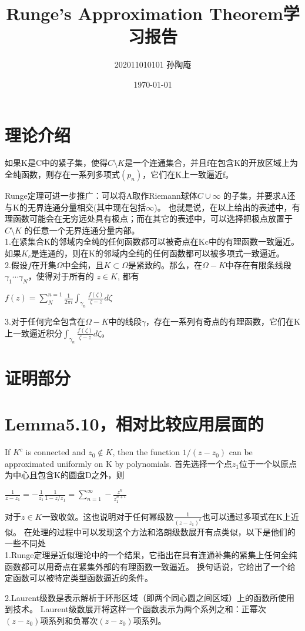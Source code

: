 \documentclass[12pt, a4paper, oneside]{article}
\title{Runge's Approximation Theorem学习报告}
\date{\today}
\author{202011010101 孙陶庵}
\begin{document}
\begin{spacing}{2.0}
\maketitle

\section{理论介绍}
如果K是C中的紧子集，使得$C\setminus K$是一个连通集合，并且f在包含K的开放区域上为全纯函数，则存在一系列多项式$(p_{n})$，它们在K上一致逼近f。

Runge定理可进一步推广：可以将A取作Riemann球体$C\cup{\infty}$ 的子集，并要求A还与K的无界连通分量相交(其中现在包括$\infty$)。
也就是说，在以上给出的表述中，有理函数可能会在无穷远处具有极点；而在其它的表述中，可以选择把极点放置于$C\setminus K$ 的任意一个无界连通分量内部。\\

1.在紧集合K的邻域内全纯的任何函数都可以被奇点在Kc中的有理函数一致逼近。如果$K_c$是连通的，则在K的邻域内全纯的任何函数都可以被多项式一致逼近。\\
2.假设$f$在开集$\Omega$中全纯，且$K \subset  \Omega$是紧致的。那么，在$\Omega - K$中存在有限条线段$\gamma_1\cdots\gamma_N$，使得对于所有的 $z\in K$, 都有

\begin{center}
    $f(z) = \sum_{N}^{n = 1}\frac{1}{2\pi i}\int_{\gamma_n}\frac{f(\zeta)}{\zeta - z}d\zeta$
\end{center}
3.对于任何完全包含在$\Omega-K$中的线段$\gamma$，存在一系列有奇点的有理函数，它们在K上一致逼近积分$\int_{\gamma_n}\frac{f(\zeta)}{\zeta - z}d\zeta$。
\section{证明部分}

\section{Lemma5.10，相对比较应用层面的}
If $K^c$ is connected and $z_0 \notin K$, then the function $1/(z − z_0)$ can be approximated uniformly on K by polynomials.
首先选择一个点$z_1$位于一个以原点为中心且包含K的圆盘D之外，则
\begin{center}
    $\frac{1}{z-z_1} = -\frac{1}{z_1}\frac{1}{1-z/z_1} = \sum_{n = 1}^{\infty}-\frac{z^n}{z_1^{n+1}}$
\end{center}
对于$z\in K$一致收敛。这也说明对于任何幂级数$\frac{1}{(z-z_1)^k}$也可以通过多项式在K上近似。
在处理的过程中可以发现这个方法和洛朗级数展开有点类似，以下是他们的一些不同处\\
1.Runge定理是近似理论中的一个结果，它指出在具有连通补集的紧集上任何全纯函数都可以用奇点在紧集外部的有理函数一致逼近。
换句话说，它给出了一个给定函数可以被特定类型函数逼近的条件。

2.Laurent级数是表示解析于环形区域（即两个同心圆之间区域）上的函数所使用到技术。
Laurent级数展开将这样一个函数表示为两个系列之和：正幂次$(z-z_0)$项系列和负幂次$(z-z_0)$项系列。
\end{spacing}{}



\end{document}
